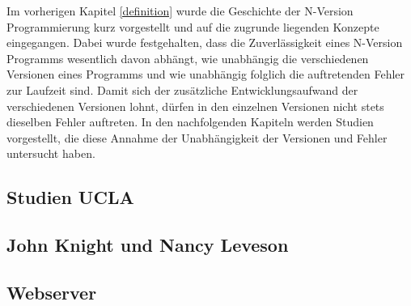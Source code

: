 %
Im vorherigen Kapitel \ref{definition} wurde die Geschichte der N-Version Programmierung kurz vorgestellt und auf die zugrunde liegenden Konzepte eingegangen.
Dabei wurde festgehalten, dass die Zuverlässigkeit eines N-Version Programms wesentlich davon abhängt, wie unabhängig die verschiedenen Versionen eines Programms und wie unabhängig folglich die auftretenden Fehler zur Laufzeit sind. Damit sich der zusätzliche Entwicklungsaufwand der verschiedenen Versionen lohnt, dürfen in den einzelnen Versionen nicht stets dieselben Fehler auftreten.
In den nachfolgenden Kapiteln werden Studien vorgestellt, die diese Annahme der Unabhängigkeit der Versionen und Fehler untersucht haben.
%
\subsection{Studien UCLA}\label{uclastudies}

\subsection{John Knight und Nancy Leveson}\label{matrixexperiement}



\subsection{Webserver}\label{webserver}